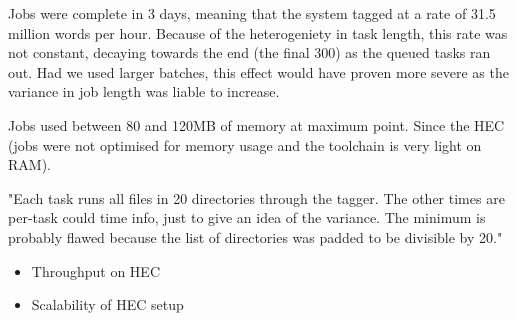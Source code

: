 % 
% 
% 
% 




Jobs were complete in 3 days, meaning that the system tagged at a rate of 31.5 million words 
per hour.  Because of the heterogeniety in task length, this rate was not constant, decaying towards the end (the final 300) as the queued tasks ran out.  Had we used larger batches, this effect would have proven more severe as the variance in job length was liable to increase.


Jobs used between 80 and 120MB of memory at maximum point.  Since the HEC  (jobs were not optimised for memory usage and the toolchain is very light on RAM).

"Each task runs all files in 20 directories through the tagger.  The other times are per-task could time info, just to give an idea of the variance.
The minimum is probably flawed because the list of directories was padded to be divisible by 20."

\begin{itemize}
    \item Throughput on HEC
    \item Scalability of HEC setup
\end{itemize}

